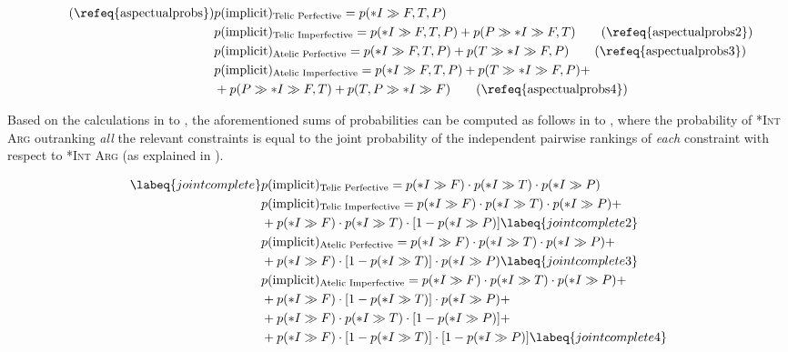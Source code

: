 \begin{align*}  \tag{\refeq{aspectualprobs}}
    & p(\text{implicit})\textsubscript{Telic Perfective} = p(*I \gg {F, T, P}) \\
    & p(\text{implicit})\textsubscript{Telic Imperfective} = p(*I \gg {F, T, P}) + p(P \gg *I \gg {F, T}) \tag{\refeq{aspectualprobs2}}\\
    & p(\text{implicit})\textsubscript{Atelic Perfective} = p(*I \gg {F, T, P}) + p(T \gg *I \gg {F, P}) \tag{\refeq{aspectualprobs3}}\\
    & p(\text{implicit})\textsubscript{Atelic Imperfective} = p(*I \gg {F, T, P}) + p(T \gg *I \gg {F, P}) + \nonumber \\ & + p(P \gg *I \gg {F, T}) + p({T, P} \gg *I \gg F) \tag{\refeq{aspectualprobs4}}
\end{align*}

Based on the calculations in  to , the aforementioned sums of probabilities can be computed as follows in  to , where the probability of \textsc{*Int Arg} outranking \textit{all} the relevant constraints is equal to the joint probability of the independent pairwise rankings of \textit{each} constraint with respect to \textsc{*Int Arg} (as explained in ).

\begin{align}  \labeq{jointcomplete}
    & p(\text{implicit})\textsubscript{Telic Perfective} = p(*I \gg F) \cdot p(*I \gg T) \cdot p(*I \gg P) \\
    & p(\text{implicit})\textsubscript{Telic Imperfective} = p(*I \gg F) \cdot p(*I \gg T) \cdot p(*I \gg P) + \nonumber \\ & + p(*I \gg F) \cdot p(*I \gg T) \cdot [1 - p(*I \gg P)] \labeq{jointcomplete2}\\
    & p(\text{implicit})\textsubscript{Atelic Perfective} = p(*I \gg F) \cdot p(*I \gg T) \cdot p(*I \gg P) + \nonumber \\ & + p(*I \gg F) \cdot [1 - p(*I \gg T)] \cdot p(*I \gg P) \labeq{jointcomplete3}\\
    & p(\text{implicit})\textsubscript{Atelic Imperfective} = p(*I \gg F) \cdot p(*I \gg T) \cdot p(*I \gg P) + \nonumber \\ & + p(*I \gg F) \cdot [1 - p(*I \gg T)] \cdot p(*I \gg P) + \nonumber \\ & + p(*I \gg F) \cdot p(*I \gg T) \cdot [1 - p(*I \gg P)] + \nonumber \\ & + p(*I \gg F) \cdot [1 - p(*I \gg T)] \cdot [1 - p(*I \gg P)] \labeq{jointcomplete4}
\end{align}

